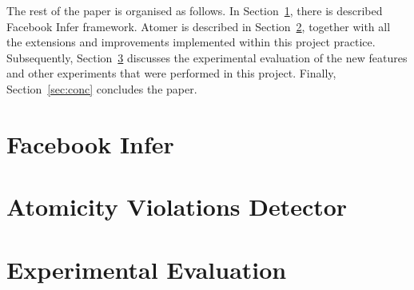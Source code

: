 The rest of the paper is organised as follows. In Section~\ref{sec:fbinfer},
there is described Facebook Infer framework. Atomer is described in
Section~\ref{sec:atomer}, together with all the extensions and improvements
implemented within this project practice. Subsequently,
Section~\ref{sec:exp} discusses the experimental evaluation of the new
features and other experiments that were performed in this project.
Finally, Section~\ref{sec:conc} concludes the paper.


\section{Facebook Infer}
\label{sec:fbinfer}



\section{Atomicity Violations Detector}
\label{sec:atomer}



\section{Experimental Evaluation}
\label{sec:exp}


\cite{inferBiabduction}
\cite{contracts2017}
\cite{racerD}
\cite{AILatticeModelCousot}
\cite{dataflowAnalysisGraphReachability}
\cite{dataflowAnalysisApproaches}
\cite{excel2019FBInfer}
\cite{staticAnalysisMoller}
\cite{favStaticAnalysis}
\cite{favAI}
\cite{projectPracticeMarcin2018}
\cite{programAnalysisNielson}
\cite{AIBasedFormalMethodsCousot}
\cite{AIInNutshellCousot}
\cite{AICousotWeb}
\cite{wideningNarrowingCousot}
\cite{favLatticesAndFixpoints}
\cite{staticRaceDetectorTruePositive}
\cite{racerDOnline}
\cite{realWorldOCaml}
\cite{inferboOnline}
\cite{contracts2015}
\cite{controlFlowAnalysisAllen}
\cite{contract}
\cite{deadlockKroening}

